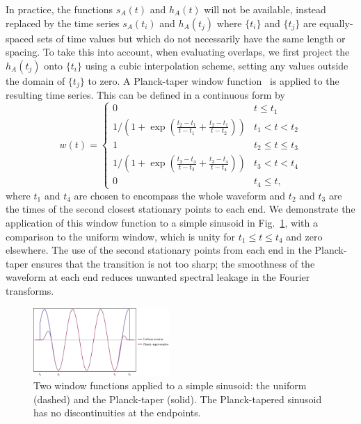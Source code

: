 \documentclass[aps,prd,amsfonts,amssymb,amsmath,nofootinbib,reprint,showpacs]{revtex4}
\newcommand{\figref}[1]{Fig.\ \ref{fig:#1}}
\begin{document}
In practice, the functions $s_A(t)$ and $h_A(t)$ will not be available, instead replaced by the time series $s_A(t_i)$ and $h_A(t_j)$ where $\{t_i\}$ and $\{t_j\}$ are equally-spaced sets of time values but which do not necessarily have the same length or spacing. To take this into account, when evaluating overlaps, we first project the $h_A(t_j)$ onto $\{t_i\}$ using a cubic interpolation scheme, setting any values outside the domain of $\{t_j\}$ to zero. A Planck-taper window function~\cite{McKechan2010} is applied to the resulting time series. This can be defined in a continuous form by
\begin{equation}
w(t) = \left\{
\begin{array}{ll}
	0 & t\leq t_1 \\
	1\big/\left(1+\exp\left(\frac{t_2-t_1}{t-t_1}+\frac{t_2-t_1}{t-t_2}\right)\right) & t_1 < t < t_2 \\
	1 & t_2\leq t\leq t_3 \\
	1\big/\left(1+\exp\left(\frac{t_3-t_4}{t-t_3}+\frac{t_3-t_4}{t-t_4}\right)\right) & t_3 < t < t_4 \\
	0 & t_4\leq t,
\end{array}\right.
\end{equation}
where $t_1$ and $t_4$ are chosen to encompass the whole waveform and $t_2$ and $t_3$ are the times of the second closest stationary points to each end. We demonstrate the application of this window function to a simple sinusoid in \figref{window-func}, with a comparison to the uniform window, which is unity for $t_1\leq t\leq t_4$ and zero elsewhere. The use of the second stationary points from each end in the Planck-taper ensures that the transition is not too sharp; the smoothness of the waveform at each end reduces unwanted spectral leakage in the Fourier transforms.

\begin{figure}[htbp]
\centering
\includegraphics[width=0.46\textwidth]{Fig_window_func}
\caption{\label{fig:window-func}Two window functions applied to a simple sinusoid: the uniform (dashed) and the Planck-taper (solid). The Planck-tapered sinusoid has no discontinuities at the endpoints.}
\end{figure}
\end{document}
